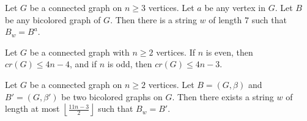 \documentclass[10pt,a4paper]{amsart}
\begin{document}
\begin{lemma}
    \label{single}
    Let $G$ be a connected graph on $n\geq 3$ vertices. Let $a$ be any vertex in $G$. Let $B$ be any bicolored graph of $G$. Then there is a string $w$ of length $7$ such that $B_w = B^a$.
\end{lemma}

\begin{theorem}
    \label{thm:main}
    Let $G$ be a connected graph with $n \geq 2$ vertices. If $n$ is even, then $cr(G) \leq 4n - 4$, and if $n$ is odd, then $cr(G) \leq 4n - 3$.
\end{theorem}

\begin{theorem}
    \label{transform}
    Let $G$ be a connected graph on $n \geq 2$ vertices. 
    Let $B = (G, \beta)$ and $B' = (G, \beta')$ be two bicolored graphs on $G$. 
    Then there exists a string $w$ of length at most $ \left \lfloor \tfrac{11n-3}{2}\right \rfloor$ such that $B_w = B'$.
\end{theorem}
\end{document}
